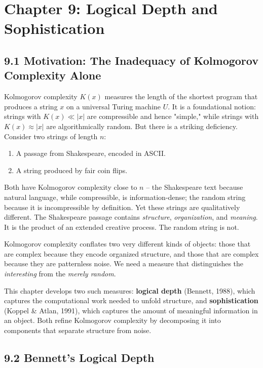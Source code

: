 \chapter{Chapter 9: Logical Depth and Sophistication}

\section{9.1 Motivation: The Inadequacy of Kolmogorov Complexity Alone}

Kolmogorov complexity $K(x)$ measures the length of the shortest program that produces a string $x$ on a universal Turing machine $U$. It is a foundational notion: strings with $K(x) \ll |x|$ are compressible and hence "simple," while strings with $K(x) \approx |x|$ are algorithmically random. But there is a striking deficiency. Consider two strings of length $n$:

\begin{enumerate}
  \item A passage from Shakespeare, encoded in ASCII.
  \item A string produced by fair coin flips.
\end{enumerate}

Both have Kolmogorov complexity close to $n$ -- the Shakespeare text because natural language, while compressible, is information-dense; the random string because it is incompressible by definition. Yet these strings are qualitatively different. The Shakespeare passage contains \textit{structure}, \textit{organization}, and \textit{meaning}. It is the product of an extended creative process. The random string is not.

Kolmogorov complexity conflates two very different kinds of objects: those that are complex because they encode organized structure, and those that are complex because they are patternless noise. We need a measure that distinguishes the \textit{interesting} from the \textit{merely random}.

This chapter develops two such measures: \textbf{logical depth} (Bennett, 1988), which captures the computational work needed to unfold structure, and \textbf{sophistication} (Koppel & Atlan, 1991), which captures the amount of meaningful information in an object. Both refine Kolmogorov complexity by decomposing it into components that separate structure from noise.

\section{9.2 Bennett's Logical Depth}

